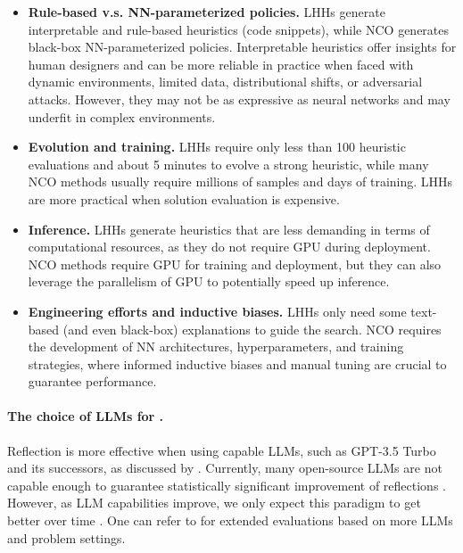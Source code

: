 \begin{itemize}[left=10pt]

\item \textbf{Rule-based v.s. NN-parameterized policies.}
LHHs generate interpretable and rule-based heuristics (code snippets), while NCO generates black-box NN-parameterized policies. Interpretable heuristics offer insights for human designers and can be more reliable in practice when faced with dynamic environments, limited data, distributional shifts, or adversarial attacks. However, they may not be as expressive as neural networks and may underfit in complex environments.

\item \textbf{Evolution and training.} 
LHHs require only less than 100 heuristic evaluations and about 5 minutes to evolve a strong heuristic, while many NCO methods usually require millions of samples and days of training. LHHs are more practical when solution evaluation is expensive.

\item \textbf{Inference.}
LHHs generate heuristics that are less demanding in terms of computational resources, as they do not require GPU during deployment. NCO methods require GPU for training and deployment, but they can also leverage the parallelism of GPU to potentially speed up inference.


\item \textbf{Engineering efforts and inductive biases.}
LHHs only need some text-based (and even black-box) explanations to guide the search. NCO requires the development of NN architectures, hyperparameters, and training strategies, where informed inductive biases and manual tuning are crucial to guarantee performance.
\end{itemize}

\paragraph{The choice of LLMs for \our{}.}
Reflection is more effective when using capable LLMs, such as GPT-3.5 Turbo and its successors, as discussed by \citet{shinn2023reflexion}. Currently, many open-source LLMs are not capable enough to guarantee statistically significant improvement of reflections \cite{zhang2024understanding}. However, as LLM capabilities improve, we only expect this paradigm to get better over time \cite{shinn2023reflexion}. One can refer to \cite{zhang2024understanding} for extended evaluations based on more LLMs and problem settings.

